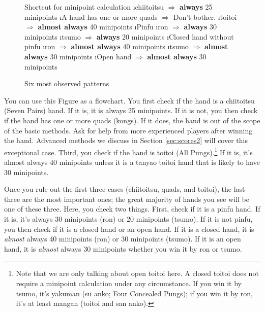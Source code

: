 \bigskip

\begin{figure}[h!]
\begin{itembox}[c]{Shortcut for minipoint calculation}
\be
\i {\jap chiitoitsu} $\Rightarrow$ {\bf always} 25 minipoints
\i A hand has one or more quads $\Rightarrow$ Don't bother. %
\i {\jap toitoi} $\Rightarrow$ {\bf almost always} 40 minipoints 
\i {\jap Pinfu}
	\bi 
	\i {\jap ron} $\Rightarrow$ {\bf always} 30 minipoints
	\i {\jap tsumo} $\Rightarrow$ {\bf always} 20 minipoints
	\ei
\i Closed hand without {\jap pinfu}
	\bi 
	\i {\jap ron} $\Rightarrow$ {\bf almost always} 40 minipoints
	\i {\jap tsumo} $\Rightarrow$ {\bf almost always} 30 minipoints
	\ei
\i Open hand $\Rightarrow$ {\bf almost always} 30 minipoints
\ee
\end{itembox}
\caption{Six most observed patterns}\label{fig:mini}
\end{figure}

You can use this Figure as a flowchart. 
You first check if the hand is a {\jap chiitoitsu} (Seven Pairs) hand. If it is, it is always 25 minipoints. If it is not, you then check if the hand has one or more quads (kongs). If it does, the hand is out of the scope of the basic methods. Ask for help from more experienced players after winning the hand. Advanced methods we discuss in Section \ref{sec:scores2} will cover this exceptional case. 
Third, you check if the hand is {\jap toitoi} (All Pungs).\footnote{Note that we are only talking about open {\jap toitoi} here. A closed {\jap toitoi} does not require a minipoint calculation under any circumstance. If you win it by {\jap tsumo}, it's {\jap yakuman} ({\jap su anko}; Four Concealed Pungs); if you win it by {\jap ron}, it's at least {\jap mangan} ({\jap toitoi} and {\jap san anko}).} If it is, it's almost always 40 minipoints unless it is a {\jap tanyao toitoi} hand that is likely to have 30 minipoints.  

\bigskip
Once you rule out the first three cases ({\jap chiitoitsu}, quads, and {\jap toitoi}), the last three are the most important ones; the great majority of hands you see will be one of these three. Here, you check two things. 
First, check if it is a {\jap pinfu} hand. If it is, it's always 30 minipoints ({\jap ron}) or 20 minipoints ({\jap tsumo}). 
If it is not {\jap pinfu}, you then check if it is a closed hand or an open hand. If it is a closed hand, it is \emph{almost} always 40 minipoints ({\jap ron}) or 30 minipoints ({\jap tsumo}). If it is an open hand, it is \emph{almost} always 30 minipoints whether you win it by {\jap ron} or {\jap tsumo}. 

